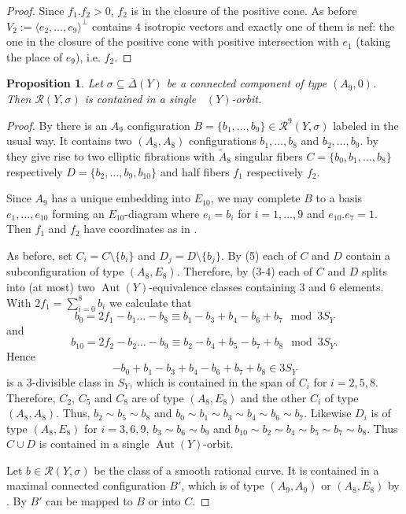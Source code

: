 \documentclass[a4paper]{amsart}
\theoremstyle{definition}
\theoremstyle{plain}
\newtheorem{proposition}[definition]{Proposition}
\DeclareMathOperator{\Aut}{Aut}
\DeclareMathOperator{\aut}{Aut^*}
\newcommand{\R}{\mathcal{R}}
\newcommand{\DeltabarY}{\overline{\Delta}(Y)}
\begin{document}
\begin{proof}
Since $f_1.f_2>0$, $f_2$ is in the closure of the positive cone. As before $V_2:=\langle e_2,\dots,e_9\rangle^\perp$ contains $4$ isotropic vectors and exactly one of them is nef: the one in the closure of the positive cone with positive intersection with $e_1$ (taking the place of $e_9$), i.e. $f_2$.

\end{proof}

\begin{proposition}
    Let $\sigma \subseteq \DeltabarY$ be a connected component of type $(A_9, 0)$.
Then $\R(Y,\sigma)$ is contained in a single $\aut(Y)$-orbit.
\end{proposition}
\begin{proof}
By  there is an $A_9$ configuration $B=\{b_1,\dots,b_9\} \in \R^9(Y,\sigma)$ labeled in the usual way.
It contains two $(A_8,A_8)$ configurations $b_1,\dots,b_8$ and $b_2,\dots,b_9$.
by  they give rise to two elliptic fibrations with $\widetilde{A}_8$ singular fibers $C =\{b_0,b_1,\dots,b_8\}$ respectively $D=\{b_2,\dots, b_9,b_{10}\}$ and half fibers $f_1$ respectively $f_2$.

Since $A_9$ has a unique embedding into $E_{10}$, we may complete $B$ to a basis $e_1,\dots, e_{10}$ forming an $E_{10}$-diagram where $e_i=b_i$ for $i=1,\dots, 9$ and $e_{10}.e_7=1$. Then $f_1$ and $f_2$ 
have coordinates as in .

As before, set $C_i = C \setminus \{b_i\}$ and $D_j = D\setminus \{b_j\}$.
By  (5) each of $C$ and $D$ contain a subconfiguration of type $(A_8,E_8)$. Therefore, by  (3-4) each of $C$ and $D$ splits into (at most) two $\Aut(Y)$-equivalence classes containing $3$ and $6$ elements. 
With $2f_1 = \sum_{i=0}^8 b_i$
we calculate that 
\[b_0 = 2f_1-b_1\dots -b_8\equiv b_1 -b_3 + b_4 - b_6 + b_7 \mod 3S_Y\]
and
\[b_{10} = 2f_2-b_2\dots -b_{9}\equiv b_2 -b_4 + b_5 - b_7 + b_8 \mod 3S_Y.\]
Hence
\[-b_0  + b_1 -b_3 + b_4 - b_6 + b_7 + b_8 \in 3S_Y\]
is a $3$-divisible class in $S_Y$, which is contained in the span of $C_i$ for $i=2,5,8$. Therefore, $C_2$, $C_5$ and $C_8$ are of type $(A_8,E_8)$ and the other $C_i$ of type $(A_8,A_8)$. Thus, $b_2\sim b_5 \sim b_8$ and $b_0\sim b_1 \sim b_3 \sim b_4 \sim b_6\sim b_7$.
Likewise $D_i$ is of type $(A_8,E_8)$ for $i=3,6,9$, $b_3\sim b_6 \sim b_9$ and $b_{10} \sim b_2 \sim b_4 \sim b_5 \sim b_7 \sim b_8 $.
Thus $C \cup D$ is contained in a single $\Aut(Y)$-orbit. 

Let $b \in \R(Y,\sigma)$ be the class of a smooth rational curve. It is contained in a maximal connected configuration $B'$, which is of type $(A_9,A_9)$ or $(A_8,E_8)$ by .
By  $B'$ can be mapped to $B$ or into $C$.
\end{proof}
\end{document}

